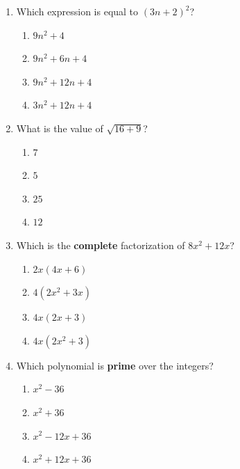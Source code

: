 \begin{enumerate}[leftmargin=1.8em, itemsep=6pt, topsep=5pt]
\small

\item Which expression is equal to $(3n+2)^2$?
\begin{enumerate}[label=(\Alph*), leftmargin=2.2em, itemsep=1pt, topsep=2pt]
  \item $9n^2+4$
  \item $9n^2+6n+4$
  \item $9n^2+12n+4$
  \item $3n^2+12n+4$
\end{enumerate}

\item What is the value of $\sqrt{16+9}$?
\begin{enumerate}[label=(\Alph*), leftmargin=2.2em, itemsep=1pt, topsep=2pt]
  \item $7$
  \item $5$
  \item $25$
  \item $12$
\end{enumerate}

\item Which is the \textbf{complete} factorization of $8x^2+12x$?
\begin{enumerate}[label=(\Alph*), leftmargin=2.2em, itemsep=1pt, topsep=2pt]
  \item $2x(4x+6)$
  \item $4(2x^2+3x)$
  \item $4x(2x+3)$
  \item $4x(2x^2+3)$
\end{enumerate}

\boxguard[7]
\item Which polynomial is \textbf{prime} over the integers?
\begin{enumerate}[label=(\Alph*), leftmargin=2.2em, itemsep=1pt, topsep=2pt]
  \item $x^2-36$
  \item $x^2+36$
  \item $x^2-12x+36$
  \item $x^2+12x+36$
\end{enumerate}


\end{enumerate}
